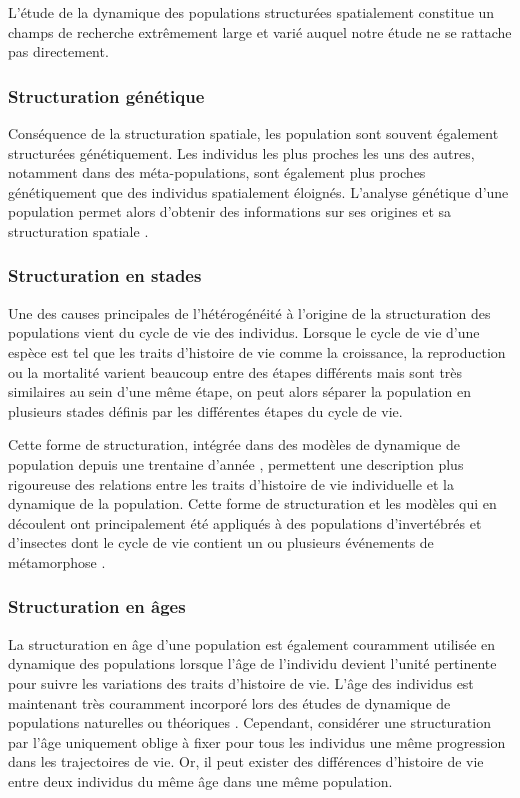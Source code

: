 L'étude de la dynamique des populations structurées spatialement constitue un
champs de recherche extrêmement large et varié auquel notre étude ne se rattache
pas directement. 

\subsubsection{Structuration génétique}

Conséquence de la structuration spatiale, les population sont souvent également
structurées génétiquement. Les individus les plus proches les uns des autres,
notamment dans des méta-populations, sont également plus proches génétiquement
que des individus spatialement éloignés. L'analyse génétique d'une population
permet alors d'obtenir des informations sur ses origines et sa structuration
spatiale \autocite{repaci2006a,booth2009a,jorde2007a}.

\subsubsection{Structuration en stades}

Une des causes principales de l'hétérogénéité à l'origine de la
structuration des populations vient du cycle de vie des individus. Lorsque le
cycle de vie d'une espèce est tel que les traits d'histoire de vie comme la
croissance, la reproduction ou la mortalité varient beaucoup entre des étapes
différents mais sont très similaires au sein d'une même étape, on peut alors
séparer la population en plusieurs stades définis par les différentes étapes du
cycle de vie.

Cette forme de structuration, intégrée dans des modèles de dynamique de
population depuis une trentaine d'année \autocite{gurney1983a,nisbet1983a},
permettent une description plus rigoureuse des relations entre les traits
d'histoire de vie individuelle et la dynamique de la population. Cette forme de
structuration et les modèles qui en découlent ont principalement été appliqués à
des populations d'invertébrés et d'insectes dont le cycle de vie contient un ou
plusieurs événements de métamorphose
\autocite{gurney1980a,gurney1983a,nisbet1983a,nisbet1989a,mccauley1996a}.

\subsubsection{Structuration en âges}

La structuration en âge d'une population est également couramment utilisée en
dynamique des populations lorsque l'âge de l'individu devient l'unité pertinente
pour suivre les variations des traits d'histoire de vie. L'âge des individus est
maintenant très couramment incorporé lors des études de dynamique de populations
naturelles ou théoriques
\autocite[par
ex. ][]{coulson2008a,marteinsdottir2002a,worden2010a,robinson2013a}. 
Cependant, considérer une structuration par l'âge uniquement oblige à fixer pour
tous les individus une même progression dans les trajectoires de vie. Or, il
peut exister des différences d'histoire de vie entre deux individus du même âge
dans une même population. 


